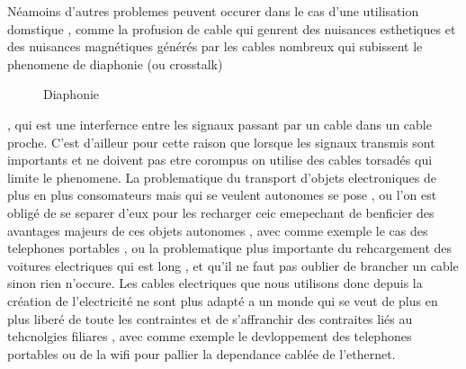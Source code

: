 \documentclass[11pt]{report}
\begin{document}
	Néamoins d'autres problemes peuvent occurer dans le cas d'une utilisation domstique , comme la profusion de cable qui genrent des nuisances esthetiques et des nuisances magnétiques générés par les cables nombreux qui subissent le phenomene de diaphonie (ou crosstalk)
\begin{figure}
  \begin{center}
    \setlength\fboxsep{0pt}
    \setlength\fboxrule{0.5pt}
  \end{center}
  \caption{Diaphonie}
\end{figure}, qui est une interfernce entre les signaux passant par un cable dans un cable proche. C'est d'ailleur pour cette raison que lorsque les signaux transmis sont importants et ne doivent pas etre corompus on utilise des cables torsadés qui limite le phenomene. La problematique du transport d'objets electroniques de plus en plus consomateurs mais qui se veulent autonomes se pose , ou l'on est obligé de se separer d'eux pour les recharger ceic emepechant de benficier des avantages majeurs de ces objets autonomes , avec comme exemple le cas des telephones portables , ou la problematique plus importante du rehcargement des voitures electriques qui est long , et qu'il ne faut pas oublier de brancher un cable sinon rien n'occure. Les cables electriques que nous utilisons donc depuis la création de l'electricité ne sont plus adapté a un monde qui se veut de plus en plus liberé de toute les contraintes et de s'affranchir des contraites liés au tehcnolgies filiares , avec comme exemple le devloppement des telephones portables ou 
de la wifi pour pallier la dependance cablée de l'ethernet.
\end{document}
